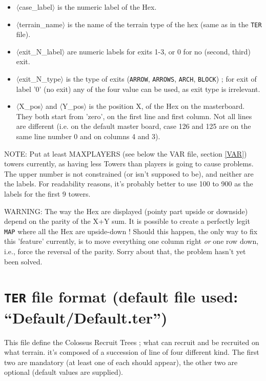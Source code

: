 \documentclass{article}
\begin{document}
\begin{itemize}
\item $\langle$case\_label$\rangle$ is the numeric label of the Hex.
\item $\langle$terrain\_name$\rangle$ is the name of the terrain type of the hex (same as in the \texttt{TER} file).
\item $\langle$exit\_N\_label$\rangle$ are numeric labels for exits 1-3, or 0 for no (second, third) exit.
\item $\langle$exit\_N\_type$\rangle$ is the type of exits (\texttt{ARROW}, \texttt{ARROWS}, \texttt{ARCH}, \texttt{BLOCK}) ; for exit of label '0' (no exit) any of the four value can be used, as exit type is irrelevant.
\item $\langle$X\_pos$\rangle$ and $\langle$Y\_pos$\rangle$ is the position X, of the Hex on the masterboard. They both start from 'zero', on the first line and first column. Not all lines are different (i.e. on the default master board, case 126 and 125 are on the same line number 0 and on columns 4 and 3).
\end{itemize}

NOTE: Put at least MAXPLAYERS (see below the VAR file, section \ref{VAR}) towers currently, as having less Towers than players is going to cause problems. The upper number is not constrained (or isn't supposed to be), and neither are the labels. For readability reasons, it's probably better to use 100 to 900 as the labels for the first 9 towers.

WARNING: The way the Hex are displayed (pointy part upside or downside) depend on the parity of the X+Y sum. It is possible to create a perfectly legit \texttt{MAP} where all the Hex are upside-down ! Should this happen, the only way to fix this 'feature' currently, is to move everything one column right \emph{or} one row down, i.e., force the reversal of the parity. Sorry about that, the problem hasn't yet been solved.

\section{\texttt{TER} file format (default file used: ``Default/Default.ter'')}
\label{TER}

This file define the Colossus Recruit Trees ; what can recruit and be recruited on what terrain. it's composed of a succession of line of four different kind.
The first two are mandatory (at least one of each should appear), the other two are optional (default values are supplied).
\end{document}
